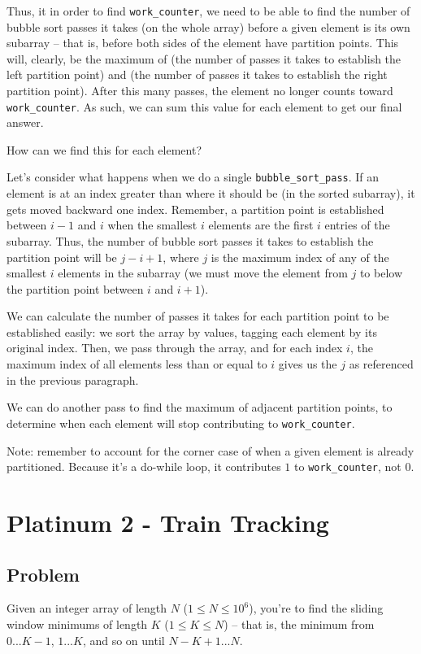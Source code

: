 \documentclass[11pt]{article}
\begin{document}
        Thus, it in order to find \verb|work_counter|, we need to be able to find the number of bubble sort passes it takes (on the whole array) before a given element is its own subarray -- that is, before both sides of the element have partition points. This will, clearly, be the maximum of (the number of passes it takes to establish the left partition point) and (the number of passes it takes to establish the right partition point). After this many passes, the element no longer counts toward \verb|work_counter|. As such, we can sum this value for each element to get our final answer.
        
        How can we find this for each element?
        
        Let's consider what happens when we do a single \verb|bubble_sort_pass|. If an element is at an index greater than where it should be (in the sorted subarray), it gets moved backward one index. Remember, a partition point is established between $i-1$ and $i$ when the smallest $i$ elements are the first $i$ entries of the subarray. Thus, the number of bubble sort passes it takes to establish the partition point will be $j-i+1$, where $j$ is the maximum index of any of the smallest $i$ elements in the subarray (we must move the element from $j$ to below the partition point between $i$ and $i+1$).
        
        We can calculate the number of passes it takes for each partition point to be established easily: we sort the array by values, tagging each element by its original index. Then, we pass through the array, and for each index $i$, the maximum index of all elements less than or equal to $i$ gives us the $j$ as referenced in the previous paragraph.
        
        We can do another pass to find the maximum of adjacent partition points, to determine when each element will stop contributing to \verb|work_counter|.
        
        Note: remember to account for the corner case of when a given element is already partitioned. Because it's a do-while loop, it contributes $1$ to \verb|work_counter|, not $0$.




\section{Platinum 2 - Train Tracking}
    \subsection{Problem}
        Given an integer array of length $N$ ($1 \leq N \leq 10^6$), you're to find the sliding window minimums of length $K$ ($1 \leq K \leq N$) -- that is, the minimum from $0...K-1$, $1...K$, and so on until $N-K+1...N$.
        
\end{document}
